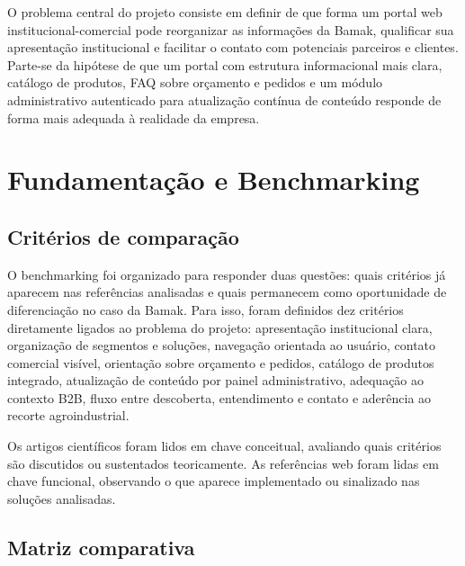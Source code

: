 \documentclass[portuguese]{sbcreviews-2025}
\begin{document}
O problema central do projeto consiste em definir de que forma um portal web institucional-comercial pode reorganizar as informações da Bamak, qualificar sua apresentação institucional e facilitar o contato com potenciais parceiros e clientes. Parte-se da hipótese de que um portal com estrutura informacional mais clara, catálogo de produtos, FAQ sobre orçamento e pedidos e um módulo administrativo autenticado para atualização contínua de conteúdo responde de forma mais adequada à realidade da empresa.

\section{Fundamentação e Benchmarking}

\subsection{Critérios de comparação}

O benchmarking foi organizado para responder duas questões: quais critérios já aparecem nas referências analisadas e quais permanecem como oportunidade de diferenciação no caso da Bamak. Para isso, foram definidos dez critérios diretamente ligados ao problema do projeto: apresentação institucional clara, organização de segmentos e soluções, navegação orientada ao usuário, contato comercial visível, orientação sobre orçamento e pedidos, catálogo de produtos integrado, atualização de conteúdo por painel administrativo, adequação ao contexto B2B, fluxo entre descoberta, entendimento e contato e aderência ao recorte agroindustrial.

Os artigos científicos foram lidos em chave conceitual, avaliando quais critérios são discutidos ou sustentados teoricamente. As referências web foram lidas em chave funcional, observando o que aparece implementado ou sinalizado nas soluções analisadas.

\subsection{Matriz comparativa}
\end{document}
